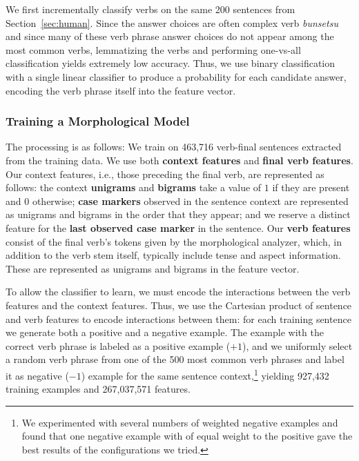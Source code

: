 We first incrementally classify verbs on the same 200 sentences from
Section~\ref{sec:human}.  Since the answer choices are often complex
verb \textit{bunsetsu} and since many of these verb phrase answer
choices do not appear among the most common verbs, lemmatizing the
verbs and performing one-vs-all classification yields extremely low
accuracy. Thus, we use binary classification with a single linear
classifier to produce a probability for each candidate answer,
encoding the verb phrase itself into the feature vector.

\subsubsection{Training a Morphological Model}
The processing is as follows: We train on 463,716 verb-final sentences
extracted from the training data.  We use both \textbf{context
  features} and \textbf{final verb features}.  Our context features,
i.e., those preceding the final verb, are represented as follows: the
context \textbf{unigrams} and \textbf{bigrams} take a value of $1$ if
they are present and $0$ otherwise; \textbf{case markers} observed in
the sentence context are represented as unigrams and bigrams in the
order that they appear; and we reserve a distinct feature for the
\textbf{last observed case marker} in the sentence.  Our \textbf{verb
  features} consist of the final verb's tokens given by the
morphological analyzer, which, in addition to the verb stem itself,
typically include tense and aspect information.  These are represented
as unigrams and bigrams in the feature vector.

To allow the classifier to learn, we must encode the interactions
between the verb features and the context features.  Thus, we
use the Cartesian product of sentence and verb features to encode
interactions between them: for each training sentence we generate
both a positive and a negative example. The example with the correct
verb phrase is labeled as a positive example ($+1$), and we uniformly
select a random verb phrase from one of the 500 most common verb
phrases and label it as negative ($-1$) example for the same sentence
context,\footnote{We experimented with several numbers of weighted
  negative examples and found that one negative example with of equal
  weight to the positive gave the best results of the configurations
  we tried.}  yielding 927,432 training examples and 267,037,571
features.


